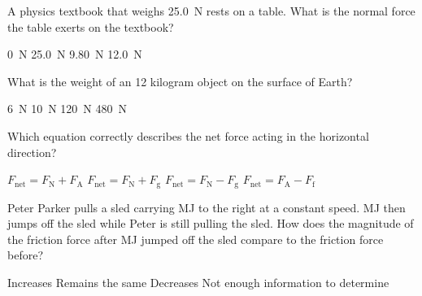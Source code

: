 \documentclass[answers]{exam}
\begin{document}
\begin{questions}
\question 
A physics textbook that weighs \SI{25.0}{N} rests on a table. What is the normal force the table exerts on the textbook?

\begin{randomizeoneparchoices}[norandomize]
    \choice \SI{0}{N}
    \correctchoice \SI{25.0}{N}
    \choice \SI{9.80}{N}
    \choice \SI{12.0}{N}
\end{randomizeoneparchoices}

\question 
What is the weight of an 12 kilogram object on the surface of Earth?

\begin{randomizeoneparchoices}[norandomize]
    \choice \SI{6}{N}
    \choice \SI{10}{N}
    \correctchoice \SI{120}{N}
    \choice \SI{480}{N}
\end{randomizeoneparchoices}

\question
Which equation correctly describes the net force acting in the horizontal direction? 

\begin{center}
\end{center}

\begin{randomizechoices}[norandomize]
    \choice $F_\mathrm{net} = F_\mathrm{N} + F_\mathrm{A}$
    \choice $F_\mathrm{net} = F_\mathrm{N} + F_\mathrm{g}$
    \choice $F_\mathrm{net} = F_\mathrm{N} - F_\mathrm{g}$
    \correctchoice $F_\mathrm{net} = F_\mathrm{A} - F_\mathrm{f}$
\end{randomizechoices}

\question 
Peter Parker pulls a sled carrying MJ to the right at a constant speed. MJ then jumps off the sled while Peter is still pulling the sled. How does the magnitude of the friction force after MJ jumped off the sled compare to the friction force before?

\begin{randomizechoices}[norandomize]
    \choice Increases
    \choice Remains the same
    \correctchoice Decreases
    \choice Not enough information to determine    
\end{randomizechoices}


\end{questions}
\end{document}
